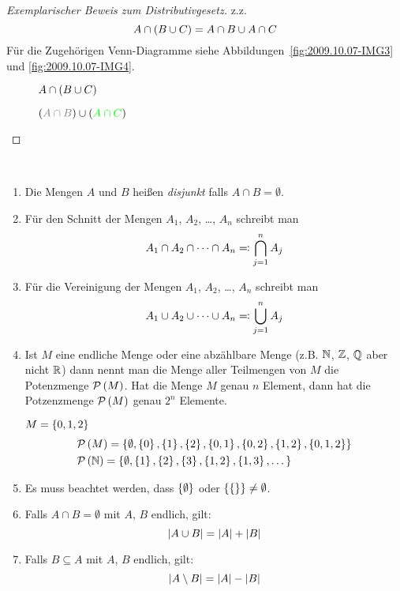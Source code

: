 \begin{proof}[Exemplarischer Beweis zum Distributivgesetz]
\ac{z.z.}
\[A \cap \left(B \cup C\right) = A \cap B \cup A \cap C\]
Für die Zugehörigen Venn-Diagramme siehe Abbildungen~\vref{fig:2009.10.07-IMG3} und \vref{fig:2009.10.07-IMG4}.
\begin{figure}[htb]
\centering

\caption{$A \cap \left(B \cup C\right)$}
\label{fig:2009.10.07-IMG3}
\end{figure}

\begin{figure}[htb]
\centering

\caption{\textcolor{blue}{$\rk{\textcolor{gray}{A \cap B}} \cup \rk{\textcolor{green}{A \cap C}}$}}
\label{fig:2009.10.07-IMG4}
\end{figure}
\end{proof}

\begin{definition}~
\begin{enumerate}
\item Die Mengen $A$ und $B$ heißen \emph{disjunkt} falls $A \cap B = \emptyset$.
\item Für den Schnitt der Mengen $A_1$, $A_2$, \dots, $A_n$ schreibt man \[A_1 \cap A_2 \cap \dots \cap A_n \mathrel{=\!\!\mathop:} \bigcap_{j = 1}^{n} A_j\]
\item Für die Vereinigung der Mengen $A_1$, $A_2$, \dots, $A_n$ schreibt man \[A_1 \cup A_2 \cup \dots \cup A_n \mathrel{=\!\!\mathop:} \bigcup_{j = 1}^{n} A_j\]
\item Ist $M$ eine endliche Menge oder eine abzählbare Menge (\ac{z.B.} $\mathbb{N}$, $\mathbb{Z}$, $\mathbb{Q}$ aber nicht $\mathbb{R}$) dann nennt man die Menge aller Teilmengen von $M$ die Potenzmenge $\mathcal{P}\left(M\right)$. Hat die Menge $M$ genau $n$ Element, dann hat die Potzenzmenge $\mathcal{P}\left(M\right)$ genau $2^n$ Elemente.
	\begin{example}
	$M = \left\{0, 1, 2\right\}$
	\begin{align*}
	&\mathcal{P}\left(M\right) = \left\{\emptyset, \left\{0\right\}, \left\{1\right\}, \left\{2\right\}, \left\{0,1\right\}, \left\{0,2\right\}, \left\{1,2\right\}, \left\{0,1,2\right\}\right\}\\
	&\mathcal{P}\left(\mathbb{N}\right) = \left\{\emptyset, \left\{1\right\}, \left\{2\right\}, \left\{3\right\}, \left\{1,2\right\}, \left\{1,3\right\}, \dots\right\}
	\end{align*}
	\end{example}

\item Es muss beachtet werden, dass $\left\{\emptyset\right\}$ oder $\left\{\left\{\right\}\right\} \neq \emptyset$.
\item Falls $A \cap B = \emptyset$ mit $A$, $B$ endlich, gilt: \[\left|A \cup B\right| = \left|A\right| + \left|B\right|\]
\item Falls $B \subseteq A$ mit $A$, $B$ endlich, gilt: \[\left|A \setminus B\right| = \left|A\right| - \left|B\right|\]
\end{enumerate}
\end{definition}

